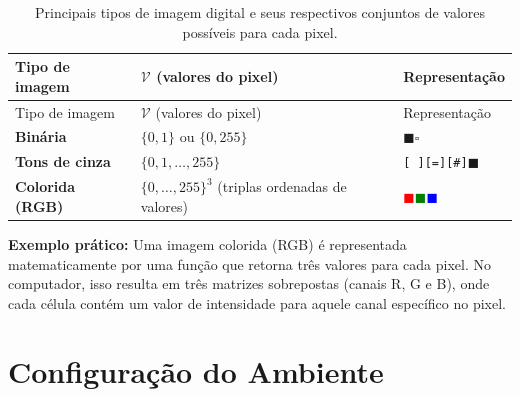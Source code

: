 \documentclass[
  portuguese,
  letterpaper,
  openany,
  oneside,
  12pt,
  a4paper]{book}
\begin{document}
\begin{longtable}[]{@{}
  >{\raggedright\arraybackslash}p{}
  >{\raggedright\arraybackslash}p{}
  >{\centering\arraybackslash}p{}@{}}
\caption{Principais tipos de imagem digital e seus respectivos conjuntos
de valores possíveis para cada
pixel.}\label{tbl-01-tipos-imagem}\tabularnewline
\toprule\noalign{}
\begin{minipage}[b]{\linewidth}\raggedright
Tipo de imagem
\end{minipage} & \begin{minipage}[b]{\linewidth}\raggedright
\(\mathcal{V}\) (valores do pixel)
\end{minipage} & \begin{minipage}[b]{\linewidth}\centering
Representação
\end{minipage} \\
\midrule\noalign{}
\endfirsthead
\toprule\noalign{}
\begin{minipage}[b]{\linewidth}\raggedright
Tipo de imagem
\end{minipage} & \begin{minipage}[b]{\linewidth}\raggedright
\(\mathcal{V}\) (valores do pixel)
\end{minipage} & \begin{minipage}[b]{\linewidth}\centering
Representação
\end{minipage} \\
\midrule\noalign{}
\endhead
\bottomrule\noalign{}
\endlastfoot
\textbf{Binária} & \(\{0, 1\}\) ou \(\{0, 255\}\) &
$\blacksquare$$\square$ \\
\textbf{Tons de cinza} & \(\{0, 1, \dots, 255\}\) &
\texttt{[~]}\texttt{[=]}\texttt{[\#]}$\blacksquare$ \\
\textbf{Colorida (RGB)} & \(\{0, \dots, 255\}^3\) (triplas ordenadas de
valores) &
\textcolor{red}{$\blacksquare$}\textcolor{green}{$\blacksquare$}\textcolor{blue}{$\blacksquare$} \\
\end{longtable}

\textbf{Exemplo prático:} Uma imagem colorida (RGB) é representada
matematicamente por uma função que retorna três valores para cada pixel.
No computador, isso resulta em três matrizes sobrepostas (canais R, G e
B), onde cada célula contém um valor de intensidade para aquele canal
específico no pixel.

\section{Configuração do Ambiente}\label{configurauxe7uxe3o-do-ambiente}
\end{document}
